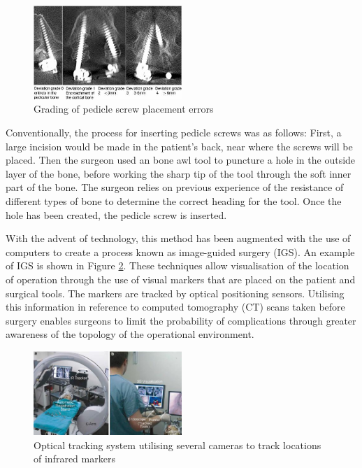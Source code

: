 \documentclass[conference, a4paper]{IEEEtran}
\begin{document}
\begin{figure}[h!]
	\centering
	\includegraphics[width=0.5\textwidth]{assets/deviation.jpg}
	\caption{Grading of pedicle screw placement errors}
	\label{fig:dev}
\end{figure}


Conventionally, the process for inserting pedicle screws was as follows:
First, a large incision would be made in the patient's back, near
where the screws will be placed. Then the surgeon used an bone awl tool
to puncture a hole in the outside layer of the bone, before working the
sharp tip of the tool through the soft inner part of the bone. The surgeon
relies on previous experience of the resistance of different types of bone to
determine the correct heading for the tool. Once the hole has been created,
the pedicle screw is inserted\cite{Manbachi2016}\cite{Sugawara2013}.

With the advent of technology, this method has been augmented with the use of computers to
create a process known as image-guided surgery (IGS)\cite{Azad2016}. An example of IGS is shown in Figure \ref{fig:igs}.
These techniques allow
visualisation of the location of operation through the use of visual markers that are
placed on the patient and surgical tools. The markers are tracked by optical positioning sensors. Utilising this
information in reference to computed tomography (CT) scans taken before surgery enables surgeons to limit the
probability of complications through greater awareness of the topology of the operational
environment\cite{Costa2011}\cite{Ozgur2009}.

\begin{figure}[h!]
	\centering
	\includegraphics[width=0.5\textwidth]{assets/igs}
	\caption{Optical tracking system utilising several cameras to track locations of infrared markers\cite{Manbachi2016}}
	\label{fig:igs}
\end{figure}
\end{document}
